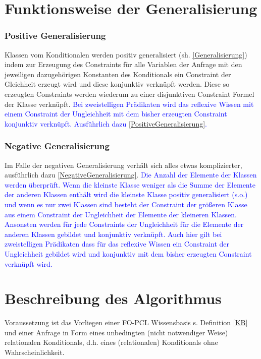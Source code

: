 \documentclass[a4paper, 11pt]{book}
\begin{document}
\label{general}
\section{Funktionsweise der Generalisierung} 
\subsubsection{Positive Generalisierung} 
Klassen vom Konditionalen werden positiv generalisiert (sh. \ref{Generalisierung}) indem zur Erzeugung des Constraints für alle Variablen der Anfrage mit den jeweiligen dazugehörigen Konstanten des Konditionals ein Constraint der Gleichheit erzeugt wird und diese konjunktiv verknüpft werden. Diese so erzeugten Constraints werden wiederum zu einer disjunktiven Constraint Formel der Klasse verknüpft.\textcolor{blue}{ Bei zweistelligen Prädikaten wird das reflexive Wissen mit einem Constraint der Ungleichheit mit dem bisher erzeugten Constraint konjunktiv verknüpft. Ausführlich dazu \ref{PositiveGeneralisierung}.}
\subsubsection{Negative Generalisierung} 
Im Falle der negativen Generalisierung verhält sich alles etwas komplizierter, ausführlich dazu \ref{NegativeGeneralisierung}. \textcolor{blue}{Die Anzahl der Elemente der Klassen werden überprüft. Wenn die kleinste Klasse weniger als die Summe der Elemente der anderen Klassen enthält wird die kleinste Klasse positiv generalisiert (s.o.) und wenn es nur zwei Klassen sind besteht der Constraint der größeren Klasse aus einem Constraint der Ungleichheit der Elemente der kleineren Klassen. Ansonsten werden für jede Constraints der Ungleichheit für die Elemente der anderen Klassen gebildet und konjunktiv verknüpft. Auch hier gilt bei zweistelligen Prädikaten dass für das reflexive Wissen ein Constraint der Ungleichheit gebildet wird und konjunktiv mit dem bisher erzeugten Constraint verknüpft wird.}



\section{Beschreibung des Algorithmus}
Voraussetzung ist das Vorliegen einer FO-PCL Wissensbasis  s. Definition \ref{KB} und einer Anfrage in Form eines unbedingten (nicht notwendiger Weise) relationalen Konditionals, d.h. eines (relationalen) Konditionals ohne Wahrscheinlichkeit.
\end{document}
